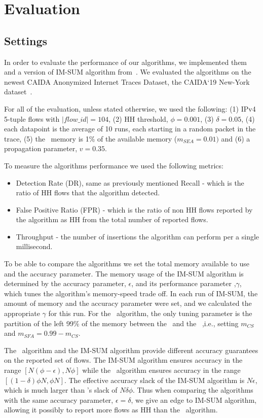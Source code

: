 \section{Evaluation}
\label{sec:evaluation}
\subsection{Settings}
In order to evaluate the performance of our algorithms, we implemented them and a version of IM-SUM algorithm from~\cite{basat2017optimal}. We evaluated the algorithms on the newest CAIDA Anonymized Internet Traces Dataset, the CAIDA`19 New-York dataset~\cite{CAIDA2019}.

For all of the evaluation, unless stated otherwise, we used the following: (1) IPv4 5-tuple flows with $|flow\_id|=104$, (2) HH threshold, $\phi=0.001$, (3) $\delta=0.05$, (4) each datapoint is the average of 10 runs, each starting in a random packet in the trace, (5) the \sea\ memory is 1\% of the available memory ($m_{SEA}=0.01)$ and (6) a propagation parameter, $v=0.35$.

To measure the algorithms performance we used the following metrics:
\begin{itemize}
    \item Detection Rate (DR), same as previously mentioned Recall - which is the ratio of HH flows that the algorithm detected.
    \item False Positive Ratio (FPR) - which is the ratio of non HH flows reported by the algorithm as HH from the total number of reported flows.
    \item Throughput - the number of insertions the algorithm can perform per a single millisecond.
\end{itemize}

To be able to compare the algorithms we set the total memory available to use and the accuracy parameter. The memory usage of the IM-SUM algorithm is determined by the accuracy parameter, $\epsilon$, and its performance parameter ,$\gamma$, which tunes the algorithm's memory-speed trade off.
In each run of IM-SUM, the amount of memory and the accuracy parameter were set, and we calculated the appropriate $\gamma$ for this run. For the \cs\ algorithm, the only tuning parameter is the partition of the left 99\% of the memory between the \cs\ and the \sfa\ ,i.e., setting $m_{CS}$ and $m_{SFA}=0.99-m_{CS}$.

The \cs\ algorithm and the IM-SUM algorithm provide different accuracy guarantees on the reported set of flows. The IM-SUM algorithm ensures accuracy in the range $[N(\phi-\epsilon),N \phi]$ while the \cs\ algorithm ensures accuracy in the range $[(1-\delta)\phi N, \phi N]$. The effective accuracy slack of the IM-SUM algorithm is $N\epsilon$, which is much larger than \cs's slack of $N\delta\phi$. Thus when comparing the algorithms with the same accuracy parameter, $\epsilon=\delta$, we give an edge to IM-SUM algorithm, allowing it possibly to report more flows as HH than the \cs\ algorithm.

